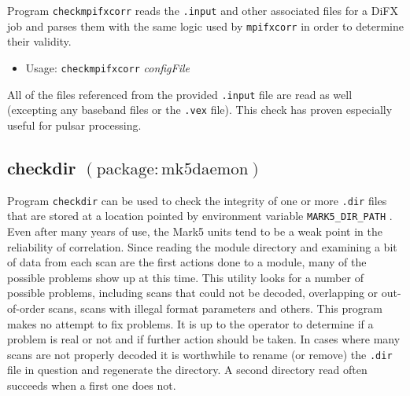 Program {\tt checkmpifxcorr} reads the {\tt .input} and other associated files for a DiFX job and parses them with the same logic used by {\tt mpifxcorr} in order to determine their validity.

\begin{itemize}
\item[] Usage: {\tt checkmpifxcorr} {\em configFile}
\end{itemize}

All of the files referenced from the provided {\tt .input} file are read as well (excepting any baseband files or the {\tt .vex} file).
This check has proven especially useful for pulsar processing.






\subsection{checkdir {\small $\mathrm{(package: mk5daemon)}$}}

Program {\tt checkdir} can be used to check the integrity of one or more {\tt .dir} files that are stored at a location pointed by environment variable {\tt MARK5\_DIR\_PATH} .
Even after many years of use, the Mark5 units tend to be a weak point in the reliability of correlation.
Since reading the module directory and examining a bit of data from each scan are the first actions done to a module, many of the possible problems show up at this time.
This utility looks for a number of possible problems, including scans that could not be decoded, overlapping or out-of-order scans, scans with illegal format parameters and others.
This program makes no attempt to fix problems.
It is up to the operator to determine if a problem is real or not and if further action should be taken.
In cases where many scans are not properly decoded it is worthwhile to rename (or remove) the {\tt .dir} file in question and regenerate the directory.  
A second directory read often succeeds when a first one does not.

